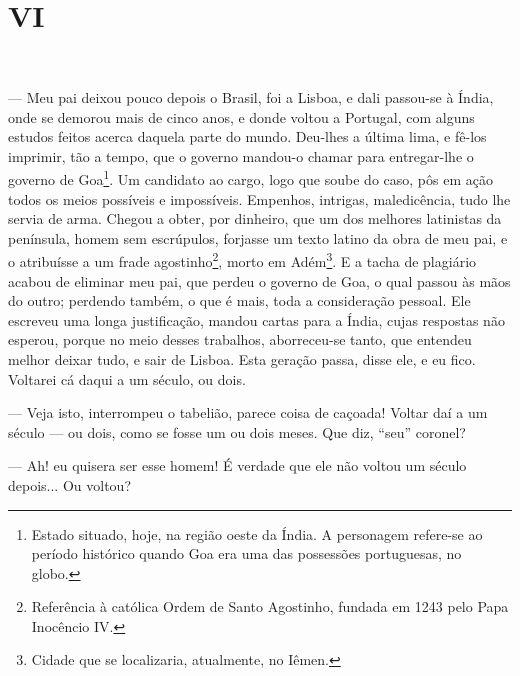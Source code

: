 ~

~

\section{VI}

~

--- Meu pai deixou pouco depois o Brasil, foi a Lisboa, e dali passou-se
à Índia, onde se demorou mais de cinco anos, e donde voltou a Portugal,
com alguns estudos feitos acerca daquela parte do mundo. Deu-lhes a
última lima, e fê-los imprimir, tão a tempo, que o governo mandou-o
chamar para entregar-lhe o governo de Goa\footnote{Estado situado, hoje,
  na região oeste da Índia. A personagem refere-se ao período histórico
  quando Goa era uma das possessões portuguesas, no globo.}. Um
candidato ao cargo, logo que soube do caso, pôs em ação todos os meios
possíveis e impossíveis. Empenhos, intrigas, maledicência, tudo lhe
servia de arma. Chegou a obter, por dinheiro, que um dos melhores
latinistas da península, homem sem escrúpulos, forjasse um texto latino
da obra de meu pai, e o atribuísse a um frade agostinho\footnote{Referência
  à católica Ordem de Santo Agostinho, fundada em 1243 pelo Papa
  Inocêncio IV.}, morto em Adém\footnote{Cidade que se localizaria,
  atualmente, no Iêmen.}. E a tacha de plagiário acabou de eliminar meu
pai, que perdeu o governo de Goa, o qual passou às mãos do outro;
perdendo também, o que é mais, toda a consideração pessoal. Ele escreveu
uma longa justificação, mandou cartas para a Índia, cujas respostas não
esperou, porque no meio desses trabalhos, aborreceu-se tanto, que
entendeu melhor deixar tudo, e sair de Lisboa. Esta geração passa, disse
ele, e eu fico. Voltarei cá daqui a um século, ou dois.

--- Veja isto, interrompeu o tabelião, parece coisa de caçoada! Voltar
daí a um século --- ou dois, como se fosse um ou dois meses. Que diz,
``seu'' coronel?

--- Ah! eu quisera ser esse homem! É verdade que ele não voltou um
século depois... Ou voltou?

